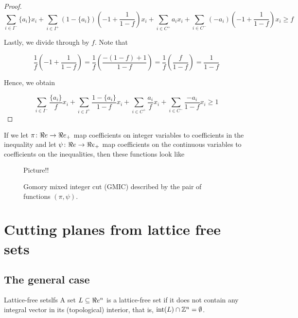 \begin{proof}
\begin{equation}
\label{eq:gmic-close2}
\sum_{i \in I^{-}} \{a_i\} x_i + \sum_{i \in I^+} (1-\{a_i\})\left(-1+\frac{1}{1-f}\right)x_i + \sum_{i \in C^+} a_i x_i   + \sum_{i \in C^-}(-a_i)\left(-1 + \frac{1}{1-f}\right) x_i \geq f
\end{equation}

Lastly, we divide through by $f$.  Note that

\begin{equation*}
\frac{1}{f} \left(-1+\frac{1}{1-f}\right) = 
\frac{1}{f} \left(\frac{-(1-f) + 1}{1-f}\right) = 
\frac{1}{f} \left(\frac{f}{1-f}\right) = 
\frac{1}{1-f} 
\end{equation*}

Hence, we obtain

\begin{equation*}
\label{eq:gmic-end}
\sum_{i \in I^{-}} \frac{\{a_i\}}{f} x_i + \sum_{i \in I^+} \frac{1-\{a_i\}}{1-f}x_i + 
\sum_{i \in C^+} \frac{a_i}{f} x_i   + \sum_{i \in C^-}\frac{-a_i}{1-f}x_i \geq 1
\end{equation*}


\end{proof}

If we let $\pi\colon \Re e \to \Re e_+$ map coefficients on integer variables to coefficients in the inequality and let $\psi \colon \Re e \to \Re e_+$ map coefficients on the continuous variables to coefficients on the inequalities, then these functions look like



\begin{figure}[h]

Picture!!

\caption{Gomory mixed integer cut (GMIC) described by the pair of functions $(\pi, \psi)$.}

\end{figure}



\section{Cutting planes from lattice free sets}
\subsection{ The general case}

\begin{definition}{Lattice-free sets}{lfs} A set $L\subseteq \Re e^n$ is a lattice-free set if it does not contain any integral vector in its (topological) interior, that is, ${\textup{int}}(L)\cap{\mathbb{Z}}^n=\emptyset$.
\end{definition}



